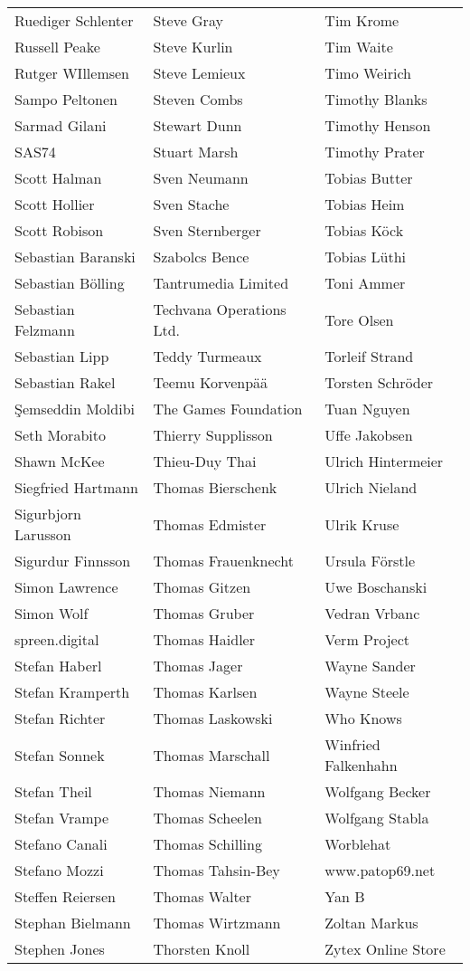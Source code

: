 \newpage
\setlength{\tabcolsep}{1mm}
\begin{tabular}{p{4.5cm}p{4.5cm}p{4.5cm}}
Ruediger Schlenter & Steve Gray & Tim Krome \\
Russell Peake & Steve Kurlin & Tim Waite \\
Rutger WIllemsen & Steve Lemieux & Timo Weirich \\
Sampo Peltonen & Steven Combs & Timothy Blanks \\
Sarmad Gilani & Stewart Dunn & Timothy Henson \\
SAS74 & Stuart Marsh & Timothy Prater \\
Scott Halman & Sven Neumann & Tobias Butter \\
Scott Hollier & Sven Stache & Tobias Heim \\
Scott Robison & Sven Sternberger & Tobias Köck \\
Sebastian Baranski & Szabolcs Bence & Tobias Lüthi \\
Sebastian Bölling & Tantrumedia Limited & Toni Ammer \\
Sebastian Felzmann & Techvana Operations Ltd. & Tore Olsen \\
Sebastian Lipp & Teddy Turmeaux & Torleif Strand \\
Sebastian Rakel & Teemu Korvenpää & Torsten Schröder \\
Şemseddin Moldibi & The Games Foundation & Tuan Nguyen \\
Seth Morabito & Thierry Supplisson & Uffe Jakobsen \\
Shawn McKee & Thieu-Duy Thai & Ulrich Hintermeier \\
Siegfried Hartmann & Thomas Bierschenk & Ulrich Nieland \\
Sigurbjorn Larusson & Thomas Edmister & Ulrik Kruse \\
Sigurdur Finnsson & Thomas Frauenknecht & Ursula Förstle \\
Simon Lawrence & Thomas Gitzen & Uwe Boschanski \\
Simon Wolf & Thomas Gruber & Vedran Vrbanc \\
spreen.digital & Thomas Haidler & Verm Project \\
Stefan Haberl & Thomas Jager & Wayne Sander \\
Stefan Kramperth & Thomas Karlsen & Wayne Steele \\
Stefan Richter & Thomas Laskowski & Who Knows \\
Stefan Sonnek & Thomas Marschall & Winfried Falkenhahn \\
Stefan Theil & Thomas Niemann & Wolfgang Becker \\
Stefan Vrampe & Thomas Scheelen & Wolfgang Stabla \\
Stefano Canali & Thomas Schilling & Worblehat \\
Stefano Mozzi & Thomas Tahsin-Bey & www.patop69.net \\
Steffen Reiersen & Thomas Walter & Yan B \\
Stephan Bielmann & Thomas Wirtzmann & Zoltan Markus \\
Stephen Jones & Thorsten Knoll & Zytex Online Store \\
\end{tabular}
